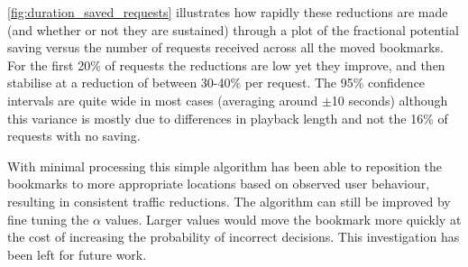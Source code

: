 
\autoref{fig:duration_saved_requests} illustrates how rapidly these reductions are made (and whether or not they are sustained) through a plot of the fractional potential saving versus the number of requests received across all the moved bookmarks. For the first 20\% of requests the reductions are low yet they improve, and then stabilise at a reduction of between 30-40\% per request. The 95\% confidence intervals are quite wide in most cases (averaging around $\pm$10 seconds) although this variance is mostly due to differences in playback length and not the 16\% of requests with no saving.

With minimal processing this simple algorithm has been able to reposition the bookmarks to more appropriate locations based on observed user behaviour, resulting in consistent traffic reductions. The algorithm can still be improved by fine tuning the $\alpha$ values. Larger values would move the bookmark more quickly at the cost of increasing the probability of incorrect decisions. This investigation has been left for future work.

%




